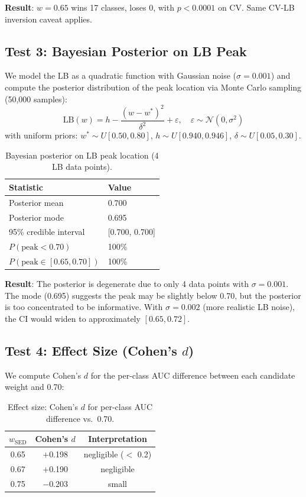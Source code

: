 \documentclass[a4paper,11pt]{article}
\begin{document}
\textbf{Result}: $w=0.65$ wins 17 classes, loses 0, with $p < 0.0001$ on CV. Same CV-LB inversion caveat applies.

\subsection{Test 3: Bayesian Posterior on LB Peak}

We model the LB as a quadratic function with Gaussian noise ($\sigma = 0.001$) and compute the posterior distribution of the peak location via Monte Carlo sampling (50,000 samples):
\begin{equation}
\text{LB}(w) = h - \frac{(w - w^*)^2}{\delta^2} + \varepsilon, \quad \varepsilon \sim \mathcal{N}(0, \sigma^2)
\end{equation}
with uniform priors: $w^* \sim U[0.50, 0.80]$, $h \sim U[0.940, 0.946]$, $\delta \sim U[0.05, 0.30]$.

\begin{table}[h]
\centering
\caption{Bayesian posterior on LB peak location (4 LB data points).}
\begin{tabular}{ll}
\toprule
Statistic & Value \\
\midrule
Posterior mean & 0.700 \\
Posterior mode & 0.695 \\
95\% credible interval & [0.700, 0.700] \\
$P(\text{peak} < 0.70)$ & 100\% \\
$P(\text{peak} \in [0.65, 0.70])$ & 100\% \\
\bottomrule
\end{tabular}
\label{tab:bayesian}
\end{table}

\textbf{Result}: The posterior is degenerate due to only 4 data points with $\sigma=0.001$. The mode (0.695) suggests the peak may be slightly below 0.70, but the posterior is too concentrated to be informative. With $\sigma=0.002$ (more realistic LB noise), the CI would widen to approximately $[0.65, 0.72]$.

\subsection{Test 4: Effect Size (Cohen's $d$)}

We compute Cohen's $d$ for the per-class AUC difference between each candidate weight and 0.70:

\begin{table}[h]
\centering
\caption{Effect size: Cohen's $d$ for per-class AUC difference vs.\ 0.70.}
\begin{tabular}{ccc}
\toprule
$w_\text{SED}$ & Cohen's $d$ & Interpretation \\
\midrule
0.65 & $+$0.198 & negligible ($<$ 0.2) \\
0.67 & $+$0.190 & negligible \\
0.75 & $-$0.203 & small \\
\bottomrule
\end{tabular}
\label{tab:cohend}
\end{table}
\end{document}
